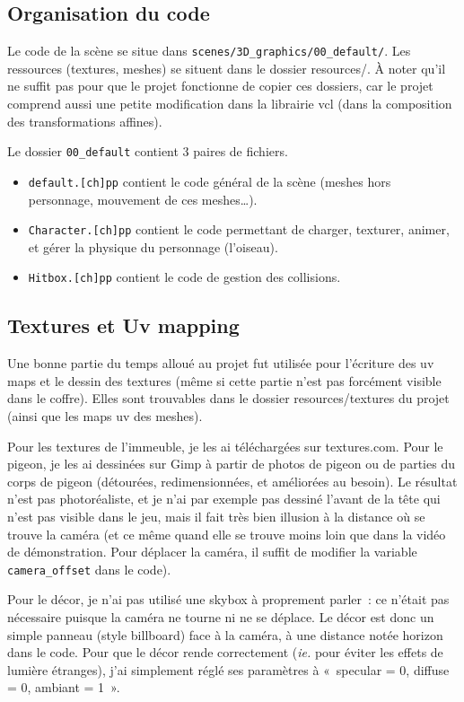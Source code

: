\documentclass[a4paper,12pt]{article}
\begin{document}
\subsection{Organisation du code}

Le code de la scène se situe dans \verb|scenes/3D_graphics/00_default/|. Les ressources (textures, meshes) se situent dans le dossier resources/. 
À noter qu’il ne suffit pas pour que le projet fonctionne de copier ces dossiers, car le projet comprend aussi une petite modification dans la librairie vcl (dans la composition des transformations affines).

Le dossier \verb|00_default| contient 3 paires de fichiers.
\begin{itemize}
    \item \verb|default.[ch]pp| contient le code général de la scène
        (meshes hors personnage, mouvement de ces meshes…). 
    \item \verb|Character.[ch]pp| contient le code permettant de 
        charger, texturer, animer, et gérer la physique du personnage (l’oiseau).
    \item \verb|Hitbox.[ch]pp| contient le code de gestion des collisions.
\end{itemize}

\subsection{Textures et Uv mapping}
Une bonne partie du temps alloué au projet fut utilisée pour l’écriture des uv maps et le dessin des textures (même si cette partie n’est pas forcément visible dans le coffre).
Elles sont trouvables dans le dossier resources/textures du projet (ainsi que les maps uv des meshes).

Pour les textures de l’immeuble, je les ai téléchargées sur textures.com. Pour le pigeon, je les ai dessinées sur Gimp à partir de photos de pigeon ou de parties du corps de pigeon (détourées, redimensionnées, et améliorées au besoin). Le résultat n’est pas photoréaliste, et je n’ai par exemple pas dessiné l’avant de la tête qui n’est pas visible dans le jeu, mais il fait très bien illusion à la distance où se trouve la caméra (et ce même quand elle se trouve moins loin que dans la vidéo de démonstration. Pour déplacer la caméra, il suffit de modifier la variable \verb|camera_offset| dans le code).

Pour le décor, je n’ai pas utilisé une skybox à proprement parler : ce n’était pas nécessaire puisque la caméra ne tourne ni ne se déplace. Le décor est donc un simple panneau (style billboard) face à la caméra, à une distance notée horizon dans le code.
Pour que le décor rende correctement (\textit{ie.} pour éviter les effets de lumière étranges), j’ai simplement réglé ses paramètres à « specular = 0, diffuse = 0, ambiant = 1 ». 
\end{document}
